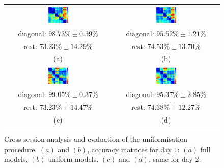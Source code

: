 \begin{figure}[!ht] \centering
  \begin{tabular}{cc}
    \includegraphics[width=0.22\textwidth]{figs/fig_resCross1_full} &
    \includegraphics[width=0.22\textwidth]{figs/fig_resCross1} \\
    diagonal: $98.73\% \pm 0.39\%$  & diagonal: $95.52\% \pm 1.21\%$ \\
        rest: $73.23\% \pm 14.29\%$ & rest: $74.53\% \pm 13.70\%$ \\
    (a) & (b) \\
    \includegraphics[width=0.22\textwidth]{figs/fig_resCross2_full} &
    \includegraphics[width=0.22\textwidth]{figs/fig_resCross2} \\
    diagonal: $99.05\% \pm 0.37\%$ & diagonal: $95.37\% \pm 2.85\%$ \\
        rest: $73.23\% \pm 14.47\%$ & rest: $74.38\% \pm 12.27\%$ \\
    (c) & (d) \\
  \end{tabular}
  \caption{Cross-session analysis and evaluation of the uniformisation
    procedure. $(a)$ and $(b)$, accuracy matrices for day $1$: $(a)$
    full models, $(b)$ uniform models. $(c)$ and $(d)$, same for day $2$.}
  \label{fig:cross_initial}
\end{figure}

